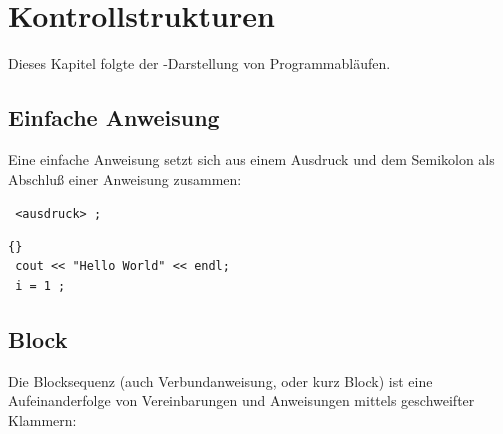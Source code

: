 \chapter{Kontrollstrukturen}
\label{p:4}
Dieses Kapitel folgte der -Darstellung von Programmabläufen.
%
%
\section{Einfache Anweisung}
\label{p:4.1}
Eine einfache Anweisung setzt sich aus einem Ausdruck und dem Semikolon
als Abschlu{\ss} einer Anweisung zusammen:
\\
\centerline {\texttt{ <ausdruck> ; }}
\begin{lstlisting}[caption=Anweisung,label=lst:4_1_1]{}
 cout << "Hello World" << endl;
 i = 1 ;
\end{lstlisting}

%
%
\section{Block}
\label{p:4.2}
%
Die Blocksequenz (auch Verbundanweisung, oder kurz Block)
ist eine Aufeinanderfolge  von Vereinbarungen und
Anweisungen mittels geschweifter Klammern:

